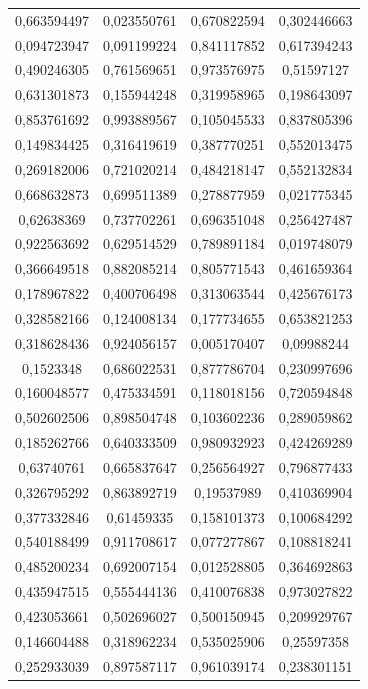 \documentclass[a4paper,12pt]{article}
\begin{document}
\begin{longtable}{|c|c|c|c|}
0,663594497 & 0,023550761 & 0,670822594 & 0,302446663 \\
0,094723947 & 0,091199224 & 0,841117852 & 0,617394243 \\
0,490246305 & 0,761569651 & 0,973576975 & 0,51597127 \\
0,631301873 & 0,155944248 & 0,319958965 & 0,198643097 \\
0,853761692 & 0,993889567 & 0,105045533 & 0,837805396 \\
0,149834425 & 0,316419619 & 0,387770251 & 0,552013475 \\
0,269182006 & 0,721020214 & 0,484218147 & 0,552132834 \\
0,668632873 & 0,699511389 & 0,278877959 & 0,021775345 \\
0,62638369 & 0,737702261 & 0,696351048 & 0,256427487 \\
0,922563692 & 0,629514529 & 0,789891184 & 0,019748079 \\
0,366649518 & 0,882085214 & 0,805771543 & 0,461659364 \\
0,178967822 & 0,400706498 & 0,313063544 & 0,425676173 \\
0,328582166 & 0,124008134 & 0,177734655 & 0,653821253 \\
0,318628436 & 0,924056157 & 0,005170407 & 0,09988244 \\
0,1523348 & 0,686022531 & 0,877786704 & 0,230997696 \\
0,160048577 & 0,475334591 & 0,118018156 & 0,720594848 \\
0,502602506 & 0,898504748 & 0,103602236 & 0,289059862 \\
0,185262766 & 0,640333509 & 0,980932923 & 0,424269289 \\
0,63740761 & 0,665837647 & 0,256564927 & 0,796877433 \\
0,326795292 & 0,863892719 & 0,19537989 & 0,410369904 \\
0,377332846 & 0,61459335 & 0,158101373 & 0,100684292 \\
0,540188499 & 0,911708617 & 0,077277867 & 0,108818241 \\
0,485200234 & 0,692007154 & 0,012528805 & 0,364692863 \\
0,435947515 & 0,555444136 & 0,410076838 & 0,973027822 \\
0,423053661 & 0,502696027 & 0,500150945 & 0,209929767 \\
0,146604488 & 0,318962234 & 0,535025906 & 0,25597358 \\
0,252933039 & 0,897587117 & 0,961039174 & 0,238301151 \\

\end{longtable}
\end{document}
